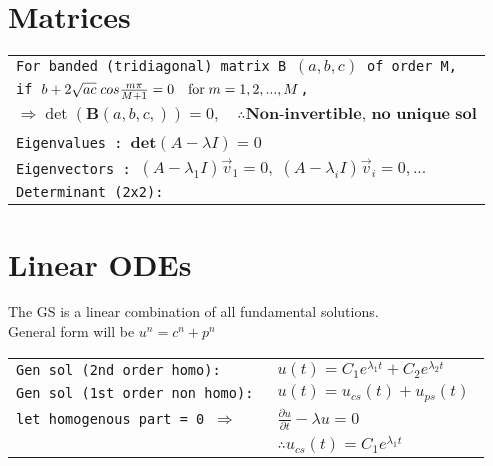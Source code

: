 \documentclass[8pt]{extarticle} %
\begin{document}
\begin{multicols*}{3}
 \section{Matrices}
  \begin{tabular}{L{2\linewidth}}
  \tt For banded (tridiagonal) matrix B $(a,b,c)$ of order M,\\
  \tt if $b+2\sqrt{ac}\;cos\frac{m\pi}{M+1}=0\quad \text{for\;}m=1,2,...,M$,\\
  \tt $\Rightarrow\det (\textbf{B}(a,b,c,))=0,\quad\therefore \textbf{Non-invertible, no unique sol}$\\
  \tt\\
  \tt Eigenvalues : $\textbf{det}(A-\lambda I) = 0$\\
  \tt Eigenvectors : $(A-\lambda_1 I)\vec{v}_1 = 0,\;(A-\lambda_i I)\vec{v}_i = 0,... $\\
  \tt Determinant (2x2): \\
  \end{tabular}
 \section{Linear ODEs}
  The GS is a linear combination of all fundamental solutions.\\
  General form will be $u^n=c^n+p^n$
  \begin{tabular}{L{0.55\linewidth} L{0.6\linewidth}}
  \tt Gen sol (2nd order homo): & $u(t)=C_1e^{\lambda_1t}+C_2e^{\lambda_2t}$ \\
  \tt Gen sol (1st order non homo): & $u(t)=u_{cs}(t)+u_{ps}(t)$ \\
  \tt let homogenous part = 0 $\Rightarrow$ & $\frac{\partial u}{\partial t}-\lambda u=0$\\
  \tt  & $\therefore u_{cs}(t)=C_1e^{\lambda_1t}$
  \end{tabular}
  \vspace{1ex}

\end{multicols*}
\end{document}
